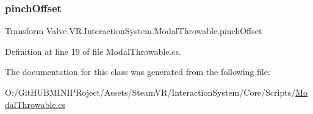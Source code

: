 \subsubsection{\texorpdfstring{pinchOffset}{pinchOffset}}
{\footnotesize\ttfamily Transform Valve.\+V\+R.\+Interaction\+System.\+Modal\+Throwable.\+pinch\+Offset}



Definition at line 19 of file Modal\+Throwable.\+cs.



The documentation for this class was generated from the following file\+:\begin{DoxyCompactItemize}
\item 
O\+:/\+Git\+H\+U\+B\+M\+I\+N\+I\+P\+Roject/\+Assets/\+Steam\+V\+R/\+Interaction\+System/\+Core/\+Scripts/\mbox{\hyperlink{_modal_throwable_8cs}{Modal\+Throwable.\+cs}}\end{DoxyCompactItemize}
